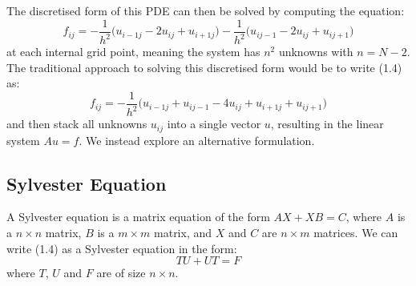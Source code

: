 \documentclass[11pt]{article}
\numberwithin{equation}{section}
\begin{document}
The discretised form of this PDE can then be solved by computing the equation:
	\begin{equation}
	f_{ij} = -\frac{1}{h^2} \big( u_{i-1j} - 2u_{ij} + u_{i+1j} \big) - \frac{1}{h^2} \big( u_{ij-1} - 2u_{ij} + u_{ij+1} \big)
	\end{equation}
at each internal grid point, meaning the system has $n^2$ unknowns with $n=N-2$. The traditional approach to solving this discretised form would be to write (1.4) as:
	\begin{equation}
	f_{ij} = -\frac{1}{h^2} \big( u_{i-1j} + u_{ij-1} - 4u_{ij} + u_{i+1j} + u_{ij+1}  \big)
	\end{equation}
and then stack all unknowns $u_{ij}$ into a single vector $u$, resulting in the linear system $Au=f$. We instead explore an alternative formulation.

\subsection{Sylvester Equation}
A Sylvester equation is a matrix equation of the form $AX + XB = C$, where $A$ is a $n \times n$ matrix, $B$ is a $m \times m$ matrix, and $X$ and $C$ are $n \times m$ matrices. We can write (1.4) as a Sylvester equation in the form:
	\begin{equation}
	TU + UT = F
	\end{equation}
where $T$, $U$ and $F$ are of size $n \times n$.
\end{document}
